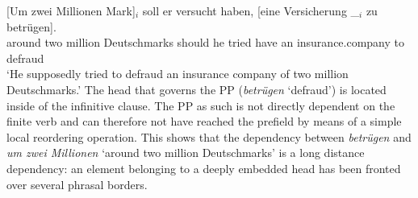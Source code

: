 \ea
\gll{}[Um zwei Millionen Mark]$_i$ soll er versucht haben, [eine Versicherung \_$_i$ zu betrügen].\footnotemark\\
      \spacebr{}around two million Deutschmarks should he tried have \spacebr{}an insurance.company
              {} to defraud\\
\glt `He supposedly tried to defraud an insurance company of two million Deutschmarks.'
\z
%
The head that governs the PP (\emph{betrügen} `defraud') is located inside of the infinitive clause. The PP as such is not directly dependent on the finite
verb and can therefore not have reached the prefield by means of a simple local reordering operation. This
shows that the dependency between \emph{betrügen} and \emph{um zwei Millionen} `around two million
Deutschmarks' is a long distance dependency: an element belonging to a deeply embedded head has been fronted over several phrasal borders.

